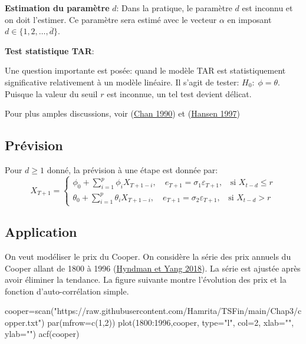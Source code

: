 \documentclass[
  french,
]{article}
\newenvironment{Shaded}{\begin{snugshade}}{\end{snugshade}}
\newcommand{\AttributeTok}[1]{\textcolor[rgb]{0.77,0.63,0.00}{#1}}
\newcommand{\DecValTok}[1]{\textcolor[rgb]{0.00,0.00,0.81}{#1}}
\newcommand{\FunctionTok}[1]{\textcolor[rgb]{0.00,0.00,0.00}{#1}}
\newcommand{\NormalTok}[1]{#1}
\newcommand{\OtherTok}[1]{\textcolor[rgb]{0.56,0.35,0.01}{#1}}
\newcommand{\SpecialCharTok}[1]{\textcolor[rgb]{0.00,0.00,0.00}{#1}}
\newcommand{\StringTok}[1]{\textcolor[rgb]{0.31,0.60,0.02}{#1}}
\begin{document}
\textbf{Estimation du paramètre} \(d\): Dans la pratique, le paramètre
\(d\) est inconnu et on doit l'estimer. Ce paramètre sera estimé avec le
vecteur \(\alpha\) en imposant \(d \in \{1,2,\ldots,\overline{d}\}\).

\textbf{Test statistique TAR}:

Une question importante est posée: quand le modèle TAR est
statistiquement significative relativement à un modèle linéaire. Il
s'agit de tester: \(H_0:\; \phi=\theta\). Puisque la valeur du seuil
\(r\) est inconnue, un tel test devient délicat.

Pour plus amples discussions, voir (\protect\hyperlink{ref-chan90}{Chan
1990}) et (\protect\hyperlink{ref-hansen97}{Hansen 1997})

\hypertarget{pruxe9vision}{%
\subsection{Prévision}\label{pruxe9vision}}

Pour \(d \geq 1\) donné, la prévision à une étape est donnée par: \[
X_{T+1}=\begin{cases}
\phi_0+\displaystyle\sum_{i=1}^p\phi_iX_{T+1-i},\quad e_{T+1}=\sigma_1\varepsilon_{T+1},\;\;\text{ si } X_{t-d}\leq r\\
\theta_0+\displaystyle\sum_{i=1}^p\theta_iX_{T+1-i},\quad e_{T+1}=\sigma_2\varepsilon_{T+1},\;\;\text{ si } X_{t-d}> r
\end{cases}
\]

\hypertarget{application}{%
\subsection{Application}\label{application}}

On veut modéliser le prix du Cooper. On considère la série des prix
annuels du Cooper allant de 1800 à 1996
(\protect\hyperlink{ref-hyndman2016}{Hyndman et Yang 2018}). La série
est ajustée après avoir éliminer la tendance. La figure suivante montre
l'évolution des prix et la fonction d'auto-corrélation simple.

\begin{Shaded}
\begin{Highlighting}[]
\NormalTok{cooper}\OtherTok{=}\FunctionTok{scan}\NormalTok{(}\StringTok{"https://raw.githubusercontent.com/Hamrita/TSFin/main/Chap3/copper.txt"}\NormalTok{)}
\FunctionTok{par}\NormalTok{(}\AttributeTok{mfrow=}\FunctionTok{c}\NormalTok{(}\DecValTok{1}\NormalTok{,}\DecValTok{2}\NormalTok{))}
\FunctionTok{plot}\NormalTok{(}\DecValTok{1800}\SpecialCharTok{:}\DecValTok{1996}\NormalTok{,cooper, }\AttributeTok{type=}\StringTok{"l"}\NormalTok{, }\AttributeTok{col=}\DecValTok{2}\NormalTok{, }\AttributeTok{xlab=}\StringTok{""}\NormalTok{, }\AttributeTok{ylab=}\StringTok{""}\NormalTok{)}
\FunctionTok{acf}\NormalTok{(cooper)}
\end{Highlighting}
\end{Shaded}
\end{document}

